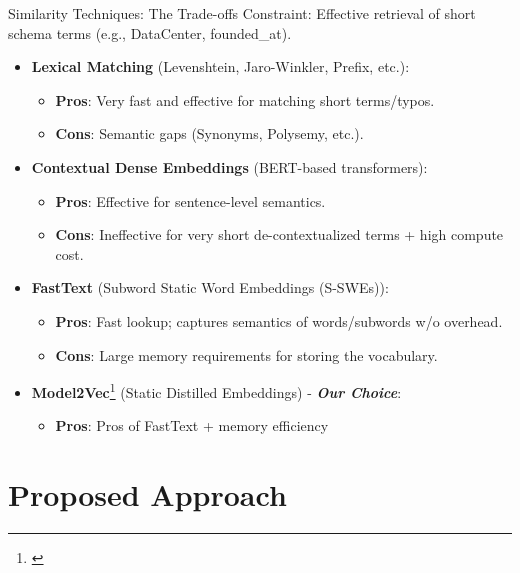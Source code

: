 \documentclass[aspectratio=169]{beamer}
\begin{document}
\begin{frame}{Similarity Techniques: The Trade-offs}
    Constraint: Effective retrieval of short schema terms (e.g., DataCenter, founded\_at).
    \begin{itemize}
        \item \textbf{Lexical Matching} (Levenshtein, Jaro-Winkler, Prefix, etc.):
        \begin{itemize}
            \item \textbf{Pros}: Very fast and effective for matching short terms/typos.
            \item \textbf{Cons}: Semantic gaps (Synonyms, Polysemy, etc.).
        \end{itemize}
        \pause
        \item \textbf{Contextual Dense Embeddings} (BERT-based transformers):
        \begin{itemize}
            \item \textbf{Pros}: Effective for sentence-level semantics.
            \item \textbf{Cons}: Ineffective for very short de-contextualized terms + high compute cost.
        \end{itemize}
        \pause
        \item \textbf{FastText} (Subword Static Word Embeddings (S-SWEs)):
        \begin{itemize}
            \item \textbf{Pros}: Fast lookup; captures semantics of words/subwords w/o overhead.
            \item \textbf{Cons}: Large memory requirements for storing the vocabulary.
        \end{itemize}
        \pause
        \item \textbf{Model2Vec}\footnote{\cite{tulkens-2024-model2vec}} (Static Distilled Embeddings) - \textbf{\textit{Our Choice}}:
        \begin{itemize}
            \item \textbf{Pros}: Pros of FastText + memory efficiency
        \end{itemize}
    \end{itemize}
\end{frame}

\section{Proposed Approach}
\end{document}
